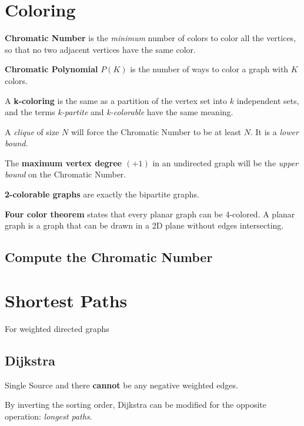 	
\section{Coloring}

	\textbf{Chromatic Number} is the \textit{minimum} number of colors to color all the vertices, so that no two adjacent vertices have the same color.

	\textbf{Chromatic Polynomial} $P(K)$ is the number of ways to color a graph with $K$ colors. 

	A \textbf{k-coloring} is the same as a partition of the vertex set into $k$ independent sets, and the terms \textit{k-partite} and \textit{k-colorable} have the same meaning.
	
	A \textit{clique} of size $N$ will force the Chromatic Number to be at least $N$. It is a \textit{lower bound}.

	The \textbf{maximum vertex degree $(+1)$} in an undirected graph will be the \textit{upper bound} on the Chromatic Number.

	\textbf{2-colorable graphs} are exactly the bipartite graphs.

	\textbf{Four color theorem} states that every planar graph can be 4-colored. 
	A planar graph is a graph that can be drawn in a 2D plane without edges intersecting.

	\subsection{Compute the Chromatic Number}
	

\section{Shortest Paths}

	For weighted directed graphs

	\subsection{Dijkstra}

		Single Source and there \textbf{cannot} be any negative weighted edges. 


		By inverting the sorting order, Dijkstra can be modified for the opposite operation: \textit{longest paths}.

